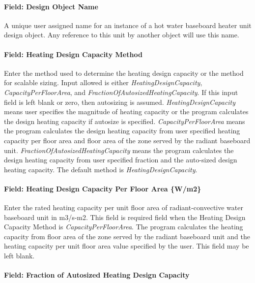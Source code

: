 \paragraph{Field: Design Object Name}\label{HW_BB_DesignObjectName}

A unique user assigned name for an instance of a hot water baseboard heater unit design object. Any reference to this unit by another object will use this name.

\paragraph{Field: Heating Design Capacity Method}\label{field-heating-design-capacity-method-000}

Enter the method used to determine the heating design capacity or the method for scalable sizing. Input allowed is either \emph{HeatingDesignCapacity}, \emph{CapacityPerFloorArea}, and \emph{FractionOfAutosizedHeatingCapacity}. If this input field is left blank or zero, then autosizing is assumed. \emph{HeatingDesignCapacity} means user specifies the magnitude of heating capacity or the program calculates the design heating capacity if autosize is specified. \emph{CapacityPerFloorArea} means the program calculates the design heating capacity from user specified heating capacity per floor area and floor area of the zone served by the radiant baseboard unit. \emph{FractionOfAutosizedHeatingCapacity} means the program calculates the design heating capacity from user specified fraction and the auto-sized design heating capacity. The default method is \emph{HeatingDesignCapacity}.

\paragraph{Field: Heating Design Capacity Per Floor Area \{W/m2\}}\label{field-heating-design-capacity-per-floor-area-wm2-000}

Enter the rated heating capacity per unit floor area of radiant-convective water baseboard unit in m3/s-m2. This field is required field when the Heating Design Capacity Method is \emph{CapacityPerFloorArea}. The program calculates the heating capacity from floor area of the zone served by the radiant baseboard unit and the heating capacity per unit floor area value specified by the user. This field may be left blank.

\paragraph{Field: Fraction of Autosized Heating Design Capacity}\label{field-fraction-of-autosized-heating-design-capacity-000}

